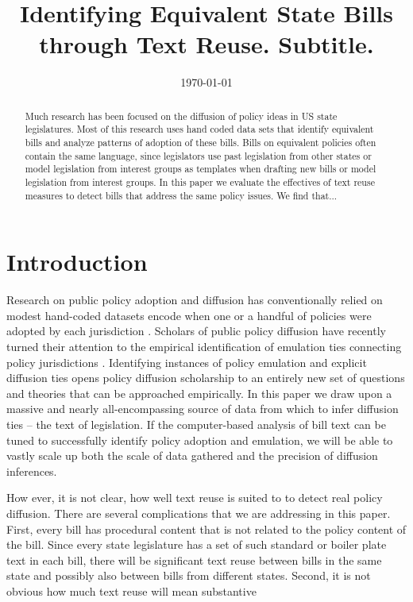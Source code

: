 \documentclass[12pt]{article} %
\begin{document}
 

\title{Identifying Equivalent State Bills through Text Reuse. \large Subtitle.}
\date{\today}
\author{}

\maketitle

\begin{abstract}
Much research has been focused on the diffusion of policy ideas in US state
legislatures. Most of this research uses hand coded data sets that identify
equivalent bills and analyze patterns of adoption of these bills. Bills on
equivalent policies often contain the same language, since legislators use past
legislation from other states or model legislation from interest groups as
templates when drafting new bills or model legislation from interest groups. In
this paper we evaluate the effectives of text reuse measures to detect bills
that address the same policy issues. We find that... 
\end{abstract}

\section{Introduction}

Research on public policy adoption and diffusion has conventionally relied on modest hand-coded datasets encode when one or a handful of policies were adopted by each jurisdiction \citep{boehmke2012}. Scholars of public policy diffusion have recently turned their attention to the empirical identification of emulation ties connecting policy jurisdictions \citep{volden2006,boehmke2009,desmarais2015,garrett2015}. Identifying instances of policy emulation and explicit diffusion ties opens policy diffusion scholarship to an entirely new set of questions and theories that can be approached empirically. In this paper we draw upon a massive and nearly all-encompassing source of data from which to infer diffusion ties -- the text of legislation. If the computer-based analysis of bill text can be tuned to successfully identify policy adoption and emulation, we will be able to vastly scale up both the scale of data gathered and the precision of diffusion inferences.


How ever, it is not clear, how well text reuse is suited to to detect real
policy diffusion. There are several complications that we are addressing in this
paper. First, every bill has procedural content that is not related to the
policy content of the bill. Since every state legislature has a set of such
standard or boiler plate text in each bill, there will be significant text reuse
between bills in the same state and possibly also between bills from different
states. Second, it is not obvious how much text reuse will mean substantive
\end{document}
